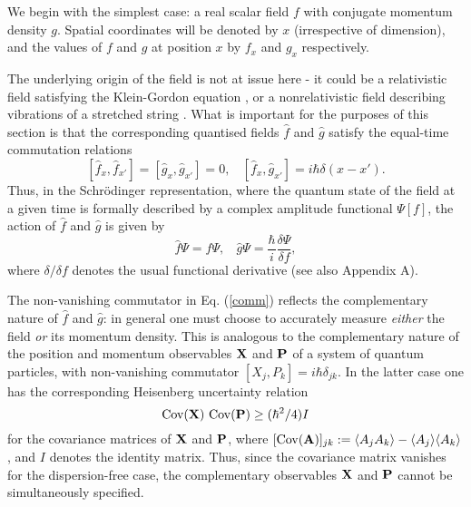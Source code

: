 \documentclass[a4paper,preprint, showpacs, aps, draft]{revtex4}
\begin{document}
{We begin with the simplest case: a real scalar field $f$ with conjugate
momentum density $g$. Spatial coordinates will be denoted by $x$
(irrespective of dimension), and the values of $f$ and $g$ at position
$x$ by $f_x$ and $g_x$ respectively.  

The underlying origin of the field is not
at issue here - it could be a relativistic field satisfying the
Klein-Gordon equation \cite{brown}, or a nonrelativistic field
describing vibrations of a stretched string \cite{goldstein}.  What
is important for the purposes of this section is that the corresponding
quantised fields $\hat{f}$ and $\hat{g}$ satisfy the equal-time
commutation relations \cite{brown}
\begin{equation} \label{comm}
[\hat{f}_x , \hat{f}_{x'}] = [\hat{g}_x , \hat{g}_{x'}] = 0,~~~~
[\hat{f}_x ,\hat{g}_{x'}] = i\hbar\delta(x-x') . 
\end{equation}
Thus, in the Schr\"{o}dinger representation, where the
quantum state of the field at a given time
is formally described by a complex amplitude
functional $\Psi[f]$, the action of $\hat{f}$ and $\hat{g}$ is given by
\cite{schweber}
\begin{equation} \label{srep}
\hat{f} \Psi = f \Psi,~~~~\hat{g} \Psi =
\frac{\hbar}{i}\frac{\delta\Psi}{\delta f} ,
\end{equation}
where $\delta /\delta f$ denotes the usual functional derivative (see
also Appendix A).

The non-vanishing commutator in Eq. (\ref{comm}) reflects the 
complementary nature of $\hat{f}$ and $\hat{g}$:  in general one must
choose to accurately measure {\it either} the field {\it or} its
momentum density. This is analogous to the complementary nature of the
position and momentum observables ${\bf X}$ and ${\bf P}$ of a system of
quantum particles, with non-vanishing commutator
$[X_j,P_k]=i\hbar\delta_{jk}$. In the latter case one has the
corresponding Heisenberg uncertainty relation \cite{cover}
\begin{equation} \label{discrete}
{\rm Cov}({\bf X})~ {\rm Cov}({\bf P}) \geq (\hbar^2/4) I 
\end{equation}
for the covariance matrices of ${\bf X}$ and ${\bf P}$, where $[{\rm
Cov}({\bf A})]_{jk}:=\langle A_jA_k\rangle - \langle A_j\rangle\langle
A_k\rangle$, and $I$ denotes the identity matrix.  Thus, since the
covariance matrix vanishes for the dispersion-free case, the
complementary observables ${\bf X}$ and
${\bf P}$ cannot be simultaneously specified.

}
\end{document}
